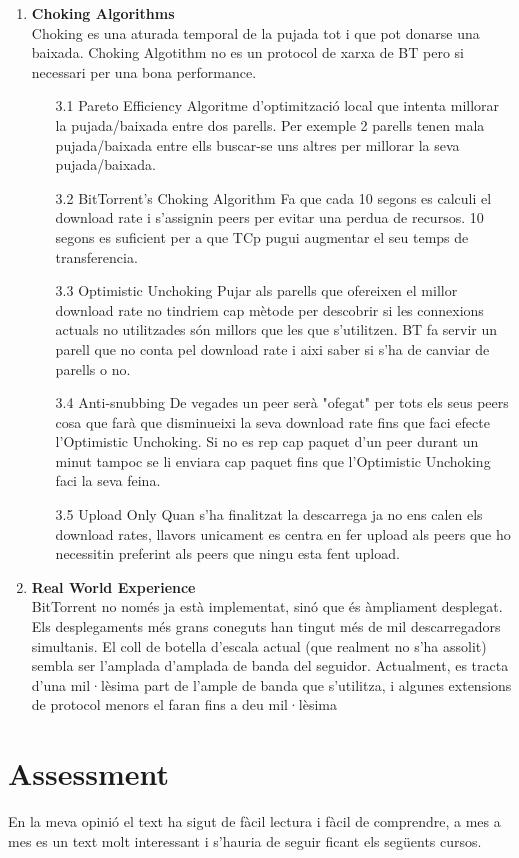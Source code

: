 \documentclass[a4paper, 10pt]{article}
\begin{document}
\begin{enumerate}
    \item \textbf{Choking Algorithms}\\
    Choking es una aturada temporal de la pujada tot i que pot donarse una baixada. Choking Algotithm no es un protocol de xarxa de BT pero si necessari per una bona performance.
    \begin{enumerate}
        \item[3.1] Pareto Efficiency
        Algoritme d'optimització local que intenta millorar la pujada/baixada entre dos parells. Per exemple 2 parells tenen mala pujada/baixada entre ells buscar-se uns altres per millorar la seva pujada/baixada.
        \item[3.2] BitTorrent’s Choking Algorithm
        Fa que cada 10 segons es calculi el download rate i s'assignin peers per evitar una perdua de recursos. 10 segons es suficient per a que TCp pugui augmentar el seu temps de transferencia.
        \item[3.3] Optimistic Unchoking
        Pujar als parells que ofereixen el millor download rate no tindriem cap mètode per descobrir si les connexions actuals no utilitzades són millors que les que s’utilitzen. BT fa servir un parell que no conta pel download rate i aixi saber si s'ha de canviar de parells o no.
        \item[3.4] Anti-snubbing
        De vegades un peer serà "ofegat" per tots els seus peers cosa que farà que disminueixi la seva download rate fins que faci efecte l'Optimistic Unchoking. Si no es rep cap paquet d'un peer durant un minut tampoc se li enviara cap paquet fins que l'Optimistic Unchoking faci la seva feina.
        \item[3.5] Upload Only
        Quan s'ha finalitzat la descarrega ja no ens calen els download rates, llavors unicament es centra en fer upload als peers que ho necessitin preferint als peers que ningu esta fent upload.
    \end{enumerate}
    
    \item \textbf{Real World Experience}\\
    BitTorrent no només ja està implementat, sinó que és àmpliament
    desplegat. Els desplegaments més grans coneguts han tingut més de mil descarregadors simultanis.
    El coll de botella d’escala actual (que realment no s’ha assolit) sembla ser l’amplada d’amplada de banda del seguidor. Actualment, es tracta d’una mil·lèsima part de l’ample de banda que s’utilitza, i algunes extensions de protocol menors el faran fins a deu
    mil·lèsima
\end{enumerate}

\section{Assessment}

En la meva opinió el text ha sigut de fàcil lectura i fàcil de comprendre, a mes a mes es un text molt interessant i s'hauria de seguir ficant els següents cursos.
\end{document}
